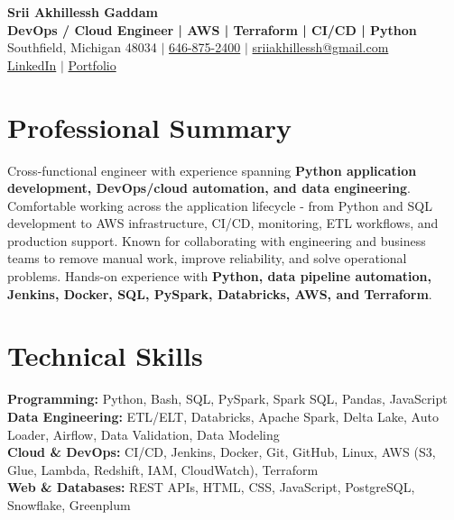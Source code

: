 \documentclass[letterpaper,10pt]{article}
\begin{document}
\fontsize{9.35pt}{10.45pt}\selectfont

\begin{center}
    {\LARGE \textbf{Srii Akhillessh Gaddam}} \\[-1pt]
    \textbf{DevOps / Cloud Engineer | AWS | Terraform | CI/CD | Python} \\[2pt]
    Southfield, Michigan 48034 $|$
    \href{tel:6468752400}{646-875-2400} $|$
    \href{mailto:sriiakhillessh@gmail.com}{sriiakhillessh@gmail.com} \\[1pt]
    \href{https://www.linkedin.com/in/srii-akhiilessh-gaddam-b48668191/}{LinkedIn} $|$
    \href{https://sriiakhillesshg.github.io/portfolio/}{Portfolio}
\end{center}
\vspace{-8pt}

\section{Professional Summary}
\small{Cross-functional engineer with experience spanning \textbf{Python application development, DevOps/cloud automation, and data engineering}. Comfortable working across the application lifecycle - from Python and SQL development to AWS infrastructure, CI/CD, monitoring, ETL workflows, and production support. Known for collaborating with engineering and business teams to remove manual work, improve reliability, and solve operational problems. Hands-on experience with \textbf{Python, data pipeline automation, Jenkins, Docker, SQL, PySpark, Databricks, AWS, and Terraform}.}

\section{Technical Skills}
\small{
\textbf{Programming:} Python, Bash, SQL, PySpark, Spark SQL, Pandas, JavaScript \\
\textbf{Data Engineering:} ETL/ELT, Databricks, Apache Spark, Delta Lake, Auto Loader, Airflow, Data Validation, Data Modeling \\
\textbf{Cloud \& DevOps:} CI/CD, Jenkins, Docker, Git, GitHub, Linux, AWS (S3, Glue, Lambda, Redshift, IAM, CloudWatch), Terraform \\
\textbf{Web \& Databases:} REST APIs, HTML, CSS, JavaScript, PostgreSQL, Snowflake, Greenplum
}
\end{document}
